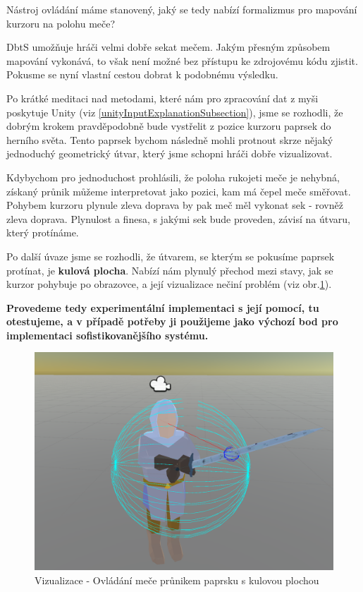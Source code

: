 Nástroj ovládání máme stanovený, jaký se tedy nabízí formalizmus pro mapování kurzoru na polohu meče?

\acl{DbtS} umožňuje hráči velmi dobře sekat mečem. Jakým přesným způsobem mapování vykonává, to však není možné bez přístupu ke zdrojovému kódu zjistit. Pokusme se nyní vlastní cestou dobrat k podobnému výsledku.

Po krátké meditaci nad metodami, které nám pro zpracování dat z myši poskytuje Unity (viz \ref{unityInputExplanationSubsection}), jsme se rozhodli, že dobrým krokem pravděpodobně bude vystřelit z pozice kurzoru paprsek do herního světa. Tento paprsek bychom následně mohli protnout skrze nějaký jednoduchý geometrický útvar, který jsme schopni hráči dobře vizualizovat. 

Kdybychom pro jednoduchost prohlásili, že poloha rukojeti meče je nehybná, získaný průnik můžeme interpretovat jako pozici, kam má čepel meče směřovat. Pohybem kurzoru plynule zleva doprava by pak meč měl vykonat sek - rovněž zleva doprava. Plynulost a finesa, s jakými sek bude proveden, závisí na útvaru, který protínáme. 

Po další úvaze jsme se rozhodli, že útvarem, se kterým se pokusíme paprsek protínat, je \textbf{kulová plocha}. Nabízí nám plynulý přechod mezi stavy, jak se kurzor pohybuje po obrazovce, a její vizualizace nečiní problém (viz obr.\ref{obr04:sphereVisualization}).

\textbf{Provedeme tedy experimentální implementaci s její pomocí, tu otestujeme, a v případě potřeby ji použijeme jako výchozí bod pro implementaci sofistikovanějšího systému.}

\begin{figure}[ht]\centering
    \center
    \includegraphics[width=140mm]{../img/IntersectableSphere.png}
    \caption{Vizualizace - Ovládání meče průnikem paprsku s kulovou plochou}
    \label{obr04:sphereVisualization}
\end{figure} 

